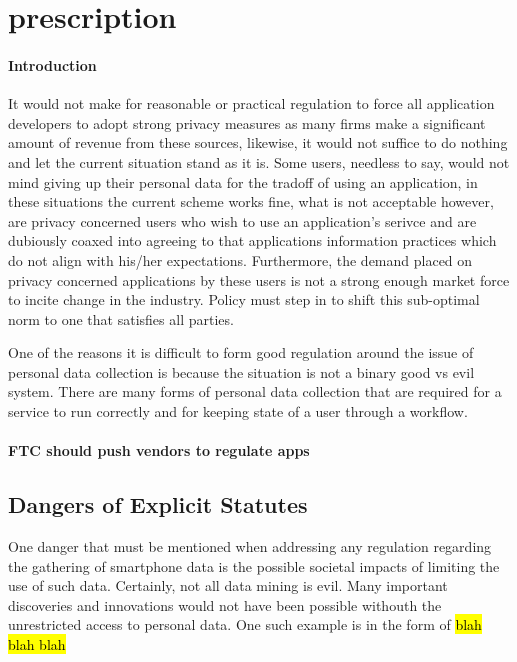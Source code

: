 \section{prescription}

	\paragraph{Introduction}


It would not make for reasonable or practical regulation to force all application developers to adopt strong privacy measures as many firms make a significant amount of revenue from these sources, likewise, it would not suffice to do nothing and let the current situation stand as it is. Some users, needless to say, would not mind giving up their personal data for the tradoff of using an application, in these situations the current scheme works fine, what is not acceptable however, are privacy concerned users who wish to use an application's serivce and are dubiously coaxed into agreeing to that applications information practices which do not align with his/her expectations. Furthermore, the demand placed on privacy concerned applications by these users is not a strong enough market force to incite change in the industry. Policy must step in to shift this sub-optimal norm to one that satisfies all parties. 



One of the reasons it is difficult to form good regulation around the issue of personal data collection is because the situation is not a binary good vs evil system. There are many forms of personal data collection that are required for a service to run correctly and for keeping state of a user through a workflow. 




\paragraph{FTC should push vendors to regulate apps}





	\subsection{Dangers of Explicit Statutes} 

One danger that must be mentioned when addressing any regulation regarding the gathering of smartphone data is the possible societal impacts of limiting the use of such data. Certainly, not all data mining is evil. Many important discoveries and innovations would not have been possible withouth the unrestricted access to personal data. One such example is in the form of \hl{blah blah blah} 